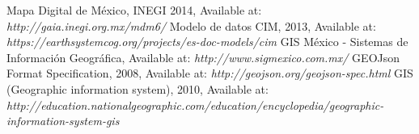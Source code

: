 \begin{thebibliography}{1}
	\label{1}
		Mapa Digital de México, INEGI 2014, Available at: \emph{http://gaia.inegi.org.mx/mdm6/}
	\label{2}
	   Modelo de datos CIM, 2013, Available at: \emph{https://earthsystemcog.org/projects/es-doc-models/cim}
	\label{3}
		 GIS México - Sistemas de Información Geográfica, Available at: \emph{http://www.sigmexico.com.mx/}
	\label{4}
	     GEOJson Format Specification, 2008, Available at: \emph{http://geojson.org/geojson-spec.html}
	\label{5}
		 GIS (Geographic information system), 2010, Available at: \emph{http://education.nationalgeographic.com/education/encyclopedia/geographic-information-system-gis}
\end{thebibliography}